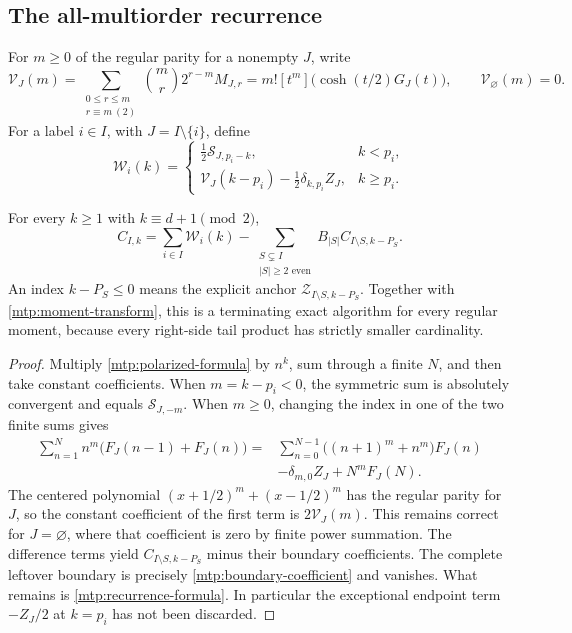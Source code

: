 \subsection{The all-multiorder recurrence}

For $m\ge0$ of the regular parity for a nonempty $J$, write
\[
 \mathcal V_J(m)=\sum_{\substack{0\le r\le m\\r\equiv m\ (2)}}
                   \binom mr2^{r-m}M_{J,r}
          =m![t^m]\bigl(\cosh(t/2)G_J(t)\bigr),
 \qquad \mathcal V_\varnothing(m)=0.
\]
For a label $i\in I$, with $J=I\setminus\{i\}$, define
\begin{equation}\label{mtp:W}
 \mathcal W_i(k)=
 \begin{cases}
  \frac12\mathcal S_{J,p_i-k},&k<p_i,\\
  \mathcal V_J(k-p_i)-\frac12\delta_{k,p_i}Z_J,&k\ge p_i.
 \end{cases}
\end{equation}

\begin{theorem}
\label{mtp:recurrence}
For every $k\ge1$ with $k\equiv d+1\pmod2$,
\begin{equation}\label{mtp:recurrence-formula}
 \boxed{C_{I,k}=\sum_{i\in I}\mathcal W_i(k)
    -\sum_{\substack{S\subsetneq I\\|S|\ge2\text{ even}}}
                     B_{|S|}C_{I\setminus S,k-P_S}.}
\end{equation}
An index $k-P_S\le0$ means the explicit anchor
$\mathcal Z_{I\setminus S,k-P_S}$. Together with
\eqref{mtp:moment-transform}, this is a terminating exact algorithm
for every regular moment, because every right-side tail product has
strictly smaller cardinality.
\end{theorem}

\begin{proof}
Multiply \eqref{mtp:polarized-formula} by $n^k$, sum through a finite
$N$, and then take constant coefficients. When $m=k-p_i<0$, the
symmetric sum is absolutely convergent and equals
$\mathcal S_{J,-m}$. When $m\ge0$, changing the index in one of the
two finite sums gives
\begin{align*}
 \sum_{n=1}^N n^m\bigl(F_J(n-1)+F_J(n)\bigr)
 ={}&\sum_{n=0}^{N-1}\bigl((n+1)^m+n^m\bigr)F_J(n)\\
    &-\delta_{m,0}Z_J+N^mF_J(N).
\end{align*}
The centered polynomial $(x+1/2)^m+(x-1/2)^m$ has the regular parity
for $J$, so the constant coefficient of the first term is
$2\mathcal V_J(m)$. This remains correct for $J=\varnothing$, where
that coefficient is zero by finite power summation.
The difference terms yield $C_{I\setminus S,k-P_S}$ minus their
boundary coefficients. The complete leftover boundary is precisely
\eqref{mtp:boundary-coefficient} and vanishes. What remains is
\eqref{mtp:recurrence-formula}. In particular the exceptional endpoint
term $-Z_J/2$ at $k=p_i$ has not been discarded.
\end{proof}

